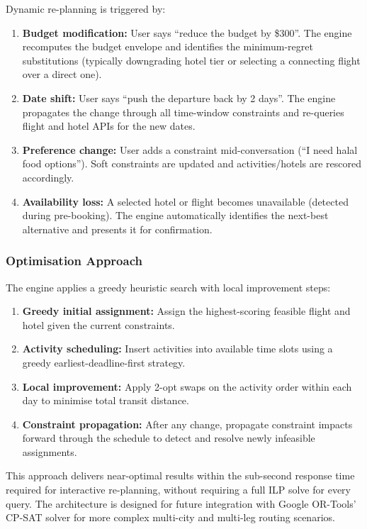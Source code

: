 \documentclass[12pt, a4paper]{article}
\begin{document}
Dynamic re-planning is triggered by:

\begin{enumerate}[leftmargin=1.5cm, itemsep=0.3em]
  \item \textbf{Budget modification:} User says ``reduce the budget by \$300''. The engine recomputes the budget envelope and identifies the minimum-regret substitutions (typically downgrading hotel tier or selecting a connecting flight over a direct one).
  \item \textbf{Date shift:} User says ``push the departure back by 2 days''. The engine propagates the change through all time-window constraints and re-queries flight and hotel APIs for the new dates.
  \item \textbf{Preference change:} User adds a constraint mid-conversation (``I need halal food options''). Soft constraints are updated and activities/hotels are rescored accordingly.
  \item \textbf{Availability loss:} A selected hotel or flight becomes unavailable (detected during pre-booking). The engine automatically identifies the next-best alternative and presents it for confirmation.
\end{enumerate}

\subsubsection{Optimisation Approach}

The engine applies a greedy heuristic search with local improvement steps:

\begin{enumerate}[leftmargin=1.5cm, itemsep=0.3em]
  \item \textbf{Greedy initial assignment:} Assign the highest-scoring feasible flight and hotel given the current constraints.
  \item \textbf{Activity scheduling:} Insert activities into available time slots using a greedy earliest-deadline-first strategy.
  \item \textbf{Local improvement:} Apply 2-opt swaps on the activity order within each day to minimise total transit distance.
  \item \textbf{Constraint propagation:} After any change, propagate constraint impacts forward through the schedule to detect and resolve newly infeasible assignments.
\end{enumerate}

This approach delivers near-optimal results within the sub-second response time required for interactive re-planning, without requiring a full ILP solve for every query. The architecture is designed for future integration with Google OR-Tools' CP-SAT solver for more complex multi-city and multi-leg routing scenarios.
\end{document}

